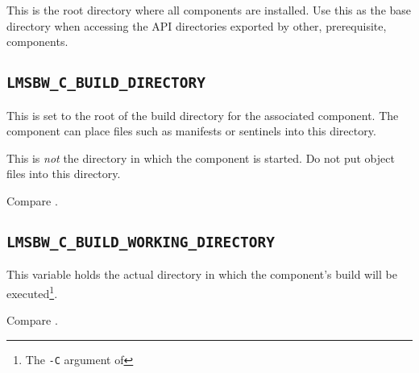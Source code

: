 This is the root directory where all components are installed.  Use
this as the base directory when accessing the API directories exported
by other, prerequisite, components.

\subsection{\texttt{LMSBW\_C\_BUILD\_DIRECTORY}}\label{wrap:lmsbw-c-build-directory}

This is set to the root of the build directory for the associated
component.  The component \makefile can place files such as \mtree
manifests or \make sentinels into this directory.

This is \emph{not} the directory in which the component \makefile is
started.   Do not put object files into this directory.

Compare .

\subsection{\texttt{LMSBW\_C\_BUILD\_WORKING\_DIRECTORY}}\label{wrap:lmsbw-c-build-working-directory}

This variable holds the actual directory in which the component's
build will be executed\footnote{The \texttt{-C} argument of \make}.

Compare .

